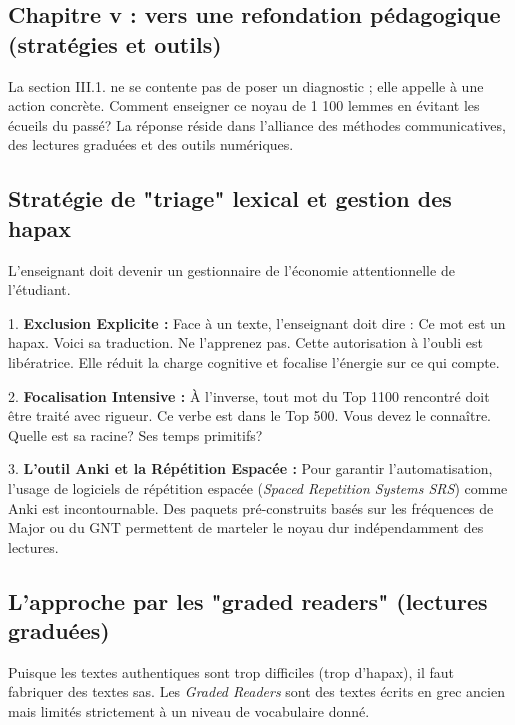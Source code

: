 {\subsection{Chapitre v : vers une refondation pédagogique (stratégies et outils)}

La section III.1.\cite{III-1-1-ref1} ne se contente pas de poser un diagnostic ; elle appelle à une
action concrète. Comment enseigner ce noyau de 1 100 lemmes en évitant les écueils du passé? La
réponse réside dans l'alliance des méthodes communicatives, des lectures graduées et des outils
numériques.



\subsection{Stratégie de "triage" lexical et gestion des hapax}

L'enseignant doit devenir un gestionnaire de l'économie attentionnelle de l'étudiant.

1. \textbf{Exclusion Explicite :} Face à un texte, l'enseignant doit dire : \og Ce mot est un hapax.
Voici sa traduction. Ne l'apprenez pas.\fg{} Cette autorisation à l'oubli est libératrice. Elle
réduit la charge cognitive et focalise l'énergie sur ce qui compte.

2. \textbf{Focalisation Intensive :} À l'inverse, tout mot du Top 1100 rencontré doit être traité
avec rigueur. \og Ce verbe est dans le Top 500. Vous devez le connaître. Quelle est sa racine? Ses
temps primitifs?\fg{}

3. \textbf{L'outil Anki et la Répétition Espacée :} Pour garantir l'automatisation, l'usage de
logiciels de répétition espacée (\textit{Spaced Repetition Systems \- SRS}) comme Anki est
incontournable. Des paquets pré-construits basés sur les fréquences de Major ou du GNT permettent de
\og marteler\fg{} le noyau dur indépendamment des lectures.\cite{III-1-1-ref51}



\subsection{L'approche par les "graded readers" (lectures graduées)}

Puisque les textes authentiques sont trop difficiles (trop d'hapax), il faut fabriquer des textes
\og sas\fg{}. Les \textit{Graded Readers} sont des textes écrits en grec ancien mais limités
strictement à un niveau de vocabulaire donné.

}
